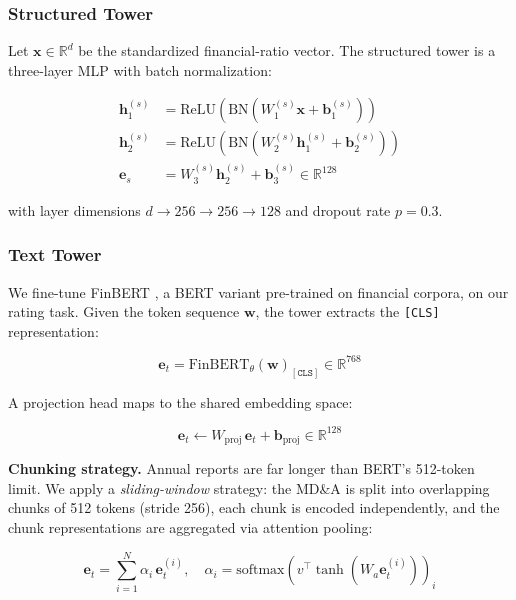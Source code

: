 \documentclass[12pt, a4paper]{article}
\begin{document}
\subsubsection{Structured Tower}

Let $\mathbf{x} \in \mathbb{R}^d$ be the standardized financial-ratio vector.  The structured tower is a three-layer MLP with batch normalization:

\begin{align}
  \mathbf{h}_1^{(s)} &= \text{ReLU}\!\left(\text{BN}\!\left(W_1^{(s)}\mathbf{x} + \mathbf{b}_1^{(s)}\right)\right) \\
  \mathbf{h}_2^{(s)} &= \text{ReLU}\!\left(\text{BN}\!\left(W_2^{(s)}\mathbf{h}_1^{(s)} + \mathbf{b}_2^{(s)}\right)\right) \\
  \mathbf{e}_s       &= W_3^{(s)}\mathbf{h}_2^{(s)} + \mathbf{b}_3^{(s)} \in \mathbb{R}^{128}
\end{align}

with layer dimensions $d \to 256 \to 256 \to 128$ and dropout rate $p = 0.3$.

\subsubsection{Text Tower}

We fine-tune FinBERT \citep{yang2020finbert}, a BERT variant pre-trained on financial corpora, on our rating task.  Given the token sequence $\mathbf{w}$, the tower extracts the \texttt{[CLS]} representation:

\begin{equation}
  \mathbf{e}_t = \text{FinBERT}_\theta(\mathbf{w})_{[\texttt{CLS}]} \in \mathbb{R}^{768}
\end{equation}

A projection head maps to the shared embedding space:

\begin{equation}
  \mathbf{e}_t \leftarrow W_{\text{proj}}\,\mathbf{e}_t + \mathbf{b}_{\text{proj}} \in \mathbb{R}^{128}
\end{equation}

\textbf{Chunking strategy.}  Annual reports are far longer than BERT's 512-token limit.  We apply a \emph{sliding-window} strategy: the MD\&A is split into overlapping chunks of 512 tokens (stride 256), each chunk is encoded independently, and the chunk representations are aggregated via attention pooling:

\begin{equation}
  \mathbf{e}_t = \sum_{i=1}^{N} \alpha_i \,\mathbf{e}_t^{(i)}, \quad
  \alpha_i = \text{softmax}\!\left(v^\top \tanh\!\left(W_a \mathbf{e}_t^{(i)}\right)\right)_i
\end{equation}
\end{document}
